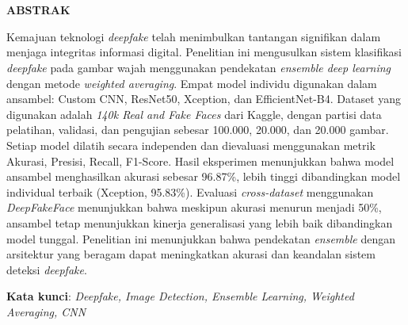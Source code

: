 \chapter*{\Judul}
\singlespacing
\begin{center}
    
    \vspace{-4em}
    
    \penulis
    
	\bigskip
    
    \textbf{ABSTRAK}
    
\end{center}


\vspace*{0.2cm}
{
	\setlength{\parindent}{0pt}

	\bigskip
	\bigskip

    \noindent
    Kemajuan teknologi \textit{deepfake} telah menimbulkan tantangan signifikan dalam menjaga integritas informasi digital. Penelitian ini mengusulkan sistem klasifikasi \textit{deepfake} pada gambar wajah menggunakan pendekatan \textit{ensemble deep learning} dengan metode \textit{weighted averaging}. Empat model individu digunakan dalam ansambel: Custom CNN, ResNet50, Xception, dan EfficientNet-B4. Dataset yang digunakan adalah \textit{140k Real and Fake Faces} dari Kaggle, dengan partisi data pelatihan, validasi, dan pengujian sebesar 100.000, 20.000, dan 20.000 gambar. Setiap model dilatih secara independen dan dievaluasi menggunakan metrik Akurasi, Presisi, Recall, F1-Score. Hasil eksperimen menunjukkan bahwa model ansambel menghasilkan akurasi sebesar 96.87\%, lebih tinggi dibandingkan model individual terbaik (Xception, 95.83\%). Evaluasi \textit{cross-dataset} menggunakan \textit{DeepFakeFace} menunjukkan bahwa meskipun akurasi menurun menjadi 50\%, ansambel tetap menunjukkan kinerja generalisasi yang lebih baik dibandingkan model tunggal. Penelitian ini menunjukkan bahwa pendekatan \textit{ensemble} dengan arsitektur yang beragam dapat meningkatkan akurasi dan keandalan sistem deteksi \textit{deepfake}.
	\bigskip

	\textbf{Kata kunci}: 	\textit{Deepfake, Image Detection, Ensemble Learning, Weighted Averaging, CNN}
}

\onehalfspacing